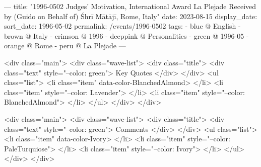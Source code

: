 ---
title: "1996-0502 Judges' Motivation, International Award La Plejade Received by (Guido on Behalf of) Śhrī Mātājī, Rome, Italy"
date: 2023-08-15
display_date: 
sort_date: 1996-05-02
permalink: /events/1996-0502
tags:
  - blue @ English
  - brown @ Italy
  - crimson @ 1996
  - deeppink @ Personalities
  - green @ 1996-05
  - orange @ Rome
  - peru @ La Plejade
---

<div class="main">
  <div class="wave-list">
    <div class="title">
      <div class="text" style="--color: green">
        Key Quotes
      </div>
    </div>
    <ul class="list">
        <li class="item" data-color-BlanchedAlmond>
        </li>
        <li class="item" style="--color: Lavender">
        </li>
        <li class="item" style="--color: BlanchedAlmond">
        </li>
      </ul>
  </div>
</div>

<div class="main">
  <div class="wave-list">
    <div class="title">
      <div class="text" style="--color: green">
        Comments
      </div>
    </div>
    <ul class="list">
        <li class="item" data-color-Ivory>
        </li>
        <li class="item" style="--color: PaleTurquiose">
        </li>
        <li class="item" style="--color: Ivory">
        </li>
      </ul>
  </div>
</div>